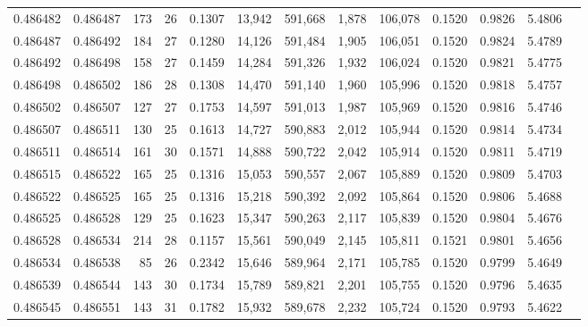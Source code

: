 \begin{tabular}{rrrrrrrrrrrrr}
0.486482 & 0.486487 & 173 &  26 &                                     0.1307 &  13,942 & 591,668 &   1,878 & 106,078 & 0.1520 & 0.9826 & 5.4806 \\
0.486487 & 0.486492 & 184 &  27 &                                     0.1280 &  14,126 & 591,484 &   1,905 & 106,051 & 0.1520 & 0.9824 & 5.4789 \\
0.486492 & 0.486498 & 158 &  27 &                                     0.1459 &  14,284 & 591,326 &   1,932 & 106,024 & 0.1520 & 0.9821 & 5.4775 \\
0.486498 & 0.486502 & 186 &  28 &                                     0.1308 &  14,470 & 591,140 &   1,960 & 105,996 & 0.1520 & 0.9818 & 5.4757 \\
0.486502 & 0.486507 & 127 &  27 &                                     0.1753 &  14,597 & 591,013 &   1,987 & 105,969 & 0.1520 & 0.9816 & 5.4746 \\
0.486507 & 0.486511 & 130 &  25 &                                     0.1613 &  14,727 & 590,883 &   2,012 & 105,944 & 0.1520 & 0.9814 & 5.4734 \\
0.486511 & 0.486514 & 161 &  30 &                                     0.1571 &  14,888 & 590,722 &   2,042 & 105,914 & 0.1520 & 0.9811 & 5.4719 \\
0.486515 & 0.486522 & 165 &  25 &                                     0.1316 &  15,053 & 590,557 &   2,067 & 105,889 & 0.1520 & 0.9809 & 5.4703 \\
0.486522 & 0.486525 & 165 &  25 &                                     0.1316 &  15,218 & 590,392 &   2,092 & 105,864 & 0.1520 & 0.9806 & 5.4688 \\
0.486525 & 0.486528 & 129 &  25 &                                     0.1623 &  15,347 & 590,263 &   2,117 & 105,839 & 0.1520 & 0.9804 & 5.4676 \\
0.486528 & 0.486534 & 214 &  28 &                                     0.1157 &  15,561 & 590,049 &   2,145 & 105,811 & 0.1521 & 0.9801 & 5.4656 \\
0.486534 & 0.486538 &  85 &  26 &                                     0.2342 &  15,646 & 589,964 &   2,171 & 105,785 & 0.1520 & 0.9799 & 5.4649 \\
0.486539 & 0.486544 & 143 &  30 &                                     0.1734 &  15,789 & 589,821 &   2,201 & 105,755 & 0.1520 & 0.9796 & 5.4635 \\
0.486545 & 0.486551 & 143 &  31 &                                     0.1782 &  15,932 & 589,678 &   2,232 & 105,724 & 0.1520 & 0.9793 & 5.4622 \\

\end{tabular}

